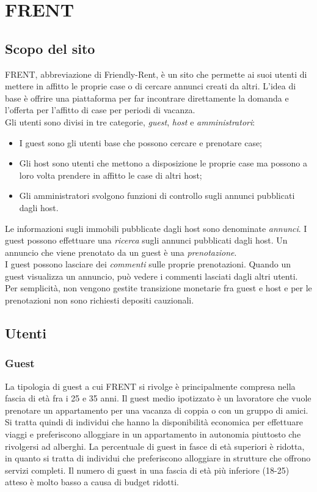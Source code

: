 \documentclass[1_relazione.tex]{subfiles}
\begin{document}
\section{FRENT}

\subsection{Scopo del sito}
FRENT, abbreviazione di Friendly-Rent, \`{e} un sito che permette ai suoi utenti di mettere in affitto le proprie case o di cercare annunci creati da altri. L'idea di base \`{e} offrire una piattaforma per far incontrare direttamente la domanda e l'offerta per l'affitto di case per periodi di vacanza. \\
Gli utenti sono divisi in tre categorie,  \textit{guest}, \textit{host} e \textit{amministratori}:
\begin{itemize}
 \item I guest sono gli utenti base che possono cercare e prenotare case;
 \item Gli host sono utenti che mettono a disposizione le proprie case ma possono a loro volta prendere in affitto le case di altri host;
 \item Gli amministratori svolgono funzioni di controllo sugli annunci pubblicati dagli host.
\end{itemize}
Le informazioni sugli immobili pubblicate dagli host sono denominate \textit{annunci}. I guest possono effettuare una \textit{ricerca} sugli annunci pubblicati dagli host. Un annuncio che viene prenotato da un guest \`{e} una \textit{prenotazione}. \\
I guest possono lasciare dei \textit{commenti} sulle proprie prenotazioni. Quando un guest visualizza un annuncio, pu\`{o} vedere i commenti lasciati dagli altri utenti. \\
Per semplicit\`{a}, non vengono gestite transizione monetarie fra guest e host e per le prenotazioni non sono richiesti depositi cauzionali.

\subsection{Utenti}

\subsubsection{Guest} 

La tipologia di guest a cui FRENT si rivolge \`{e} principalmente compresa nella fascia di et\`{a} fra i 25 e 35 anni. Il guest medio ipotizzato \`{e} un lavoratore che vuole prenotare un appartamento per una vacanza di coppia o con un gruppo di amici. Si tratta quindi di individui che hanno la disponibilit\`{a} economica per effettuare viaggi e preferiscono alloggiare in un appartamento in autonomia piuttosto che rivolgersi ad alberghi. La percentuale di guest in fasce di et\`{a} superiori \`{e} ridotta, in quanto si tratta di individui che preferiscono alloggiare in strutture che offrono servizi completi.  Il numero di guest in una fascia di et\`{a} pi\`{u} inferiore (18-25) atteso \`{e} molto basso a causa di budget ridotti.   \\
\end{document}
